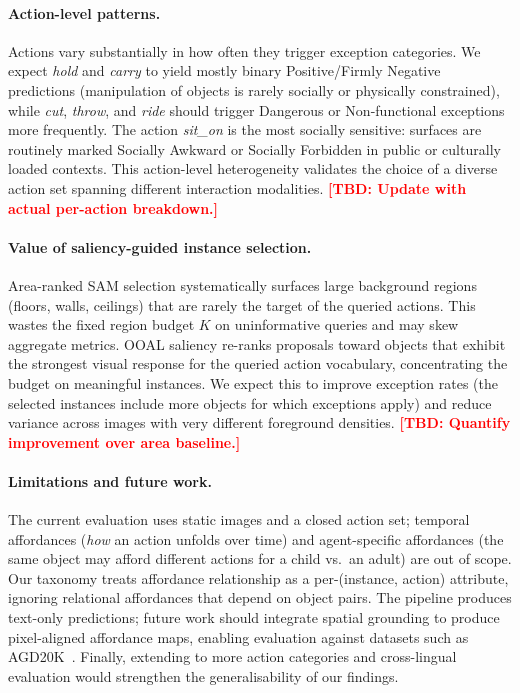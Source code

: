 \documentclass[runningheads]{llncs}
\newcommand{\TBD}[1]{\textcolor{red}{\textbf{[TBD: #1]}}}
\begin{document}
\paragraph{Action-level patterns.}
Actions vary substantially in how often they trigger exception categories.
We expect \emph{hold} and \emph{carry} to yield mostly binary
Positive/Firmly Negative predictions (manipulation of objects is rarely
socially or physically constrained), while \emph{cut}, \emph{throw}, and
\emph{ride} should trigger Dangerous or Non-functional exceptions more
frequently. The action \emph{sit\_on} is the most socially sensitive:
surfaces are routinely marked Socially Awkward or Socially Forbidden in
public or culturally loaded contexts. This action-level heterogeneity
validates the choice of a diverse action set spanning different
interaction modalities.
\TBD{Update with actual per-action breakdown.}

\paragraph{Value of saliency-guided instance selection.}
Area-ranked SAM selection systematically surfaces large background regions
(floors, walls, ceilings) that are rarely the target of the queried
actions. This wastes the fixed region budget $K$ on uninformative queries
and may skew aggregate metrics. OOAL saliency re-ranks proposals toward
objects that exhibit the strongest visual response for the queried action
vocabulary, concentrating the budget on meaningful instances. We expect
this to improve exception rates (the selected instances include more
objects for which exceptions apply) and reduce variance across images with
very different foreground densities.
\TBD{Quantify improvement over area baseline.}

\paragraph{Limitations and future work.}
The current evaluation uses static images and a closed action set; temporal
affordances (\emph{how} an action unfolds over time) and
agent-specific affordances (the same object may afford different actions
for a child vs.\ an adult) are out of scope. Our taxonomy treats
affordance relationship as a per-(instance, action) attribute, ignoring
relational affordances that depend on object pairs. The pipeline produces
text-only predictions; future work should integrate spatial grounding to
produce pixel-aligned affordance maps, enabling evaluation against
datasets such as AGD20K~\cite{ooal}. Finally, extending to more action
categories and cross-lingual evaluation would strengthen the
generalisability of our findings.
\end{document}
